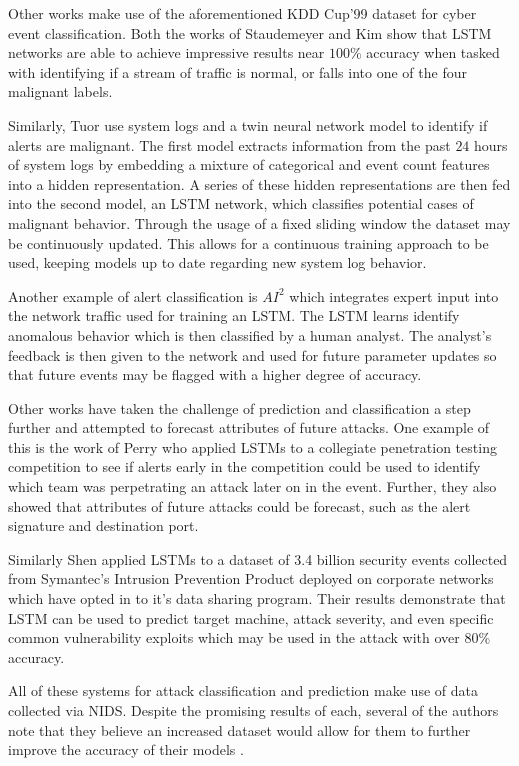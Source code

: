 Other works make use of the aforementioned KDD Cup'99 dataset for cyber event classification. Both the works of Staudemeyer \etal \cite{Staudemeyer} and Kim \etal \cite{Kim} show that LSTM networks are able to achieve impressive results near $100\%$ accuracy when tasked with identifying if a stream of traffic is normal, or falls into one of the four malignant labels. 

Similarly, Tuor \etal \cite{Tuor} use system logs and a twin neural network model to identify if alerts are malignant. The first model extracts information from the past $24$ hours of system logs by embedding a mixture of categorical and event count features into a hidden representation. A series of these hidden representations are then fed into the second model, an LSTM network, which classifies potential cases of malignant behavior. Through the usage of a fixed sliding window the dataset may be continuously updated. This allows for a continuous training approach to be used, keeping models up to date regarding new system log behavior. 

Another example of alert classification is $AI^2$ \cite{Veeramachaneni2016} which integrates expert input into the network traffic used for training an LSTM. The LSTM learns identify anomalous behavior which is then classified by a human analyst. The analyst's feedback is then given to the network and used for future parameter updates so that future events may be flagged with a higher degree of accuracy.

Other works have taken the challenge of prediction and classification a step further and attempted to forecast attributes of future attacks. One example of this is the work of Perry \etal \cite{us} who applied LSTMs to a collegiate penetration testing competition to see if alerts early in the competition could be used to identify which team was perpetrating an attack later on in the event. Further, they also showed that attributes of future attacks could be forecast, such as the alert signature and destination port. 

Similarly Shen \etal \cite{Shen2018} applied LSTMs to a dataset of 3.4 billion security events collected from Symantec's Intrusion Prevention Product deployed on corporate networks which have opted in to it's data sharing program. Their results demonstrate that LSTM can be used to predict target machine, attack severity, and even specific common vulnerability exploits which may be used in the attack with over $80\%$ accuracy. 

All of these systems for attack classification and prediction make use of data collected via NIDS. Despite the promising results of each, several of the authors note that they believe an increased dataset would allow for them to further improve the accuracy of their models \cite{us, Faber2018, Shen2018}. 

